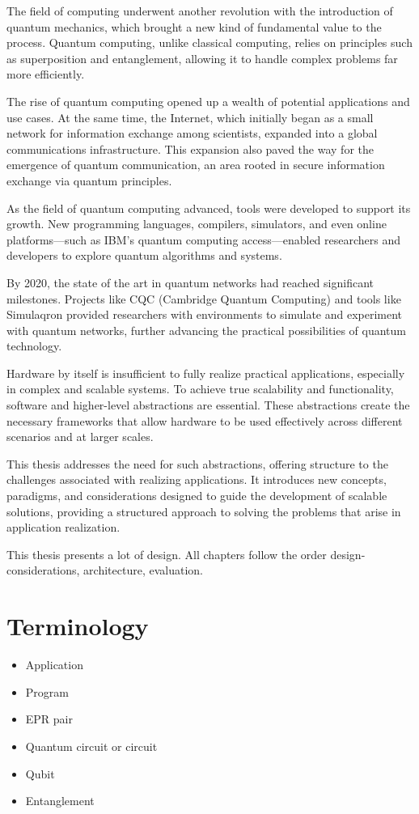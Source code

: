The field of computing underwent another revolution with the introduction of quantum mechanics, which brought a new kind of fundamental value to the process.
Quantum computing, unlike classical computing, relies on principles such as superposition and entanglement, allowing it to handle complex problems far more efficiently.

The rise of quantum computing opened up a wealth of potential applications and use cases.
At the same time, the Internet, which initially began as a small network for information exchange among scientists, expanded into a global communications infrastructure.
This expansion also paved the way for the emergence of quantum communication, an area rooted in secure information exchange via quantum principles.

As the field of quantum computing advanced, tools were developed to support its growth.
New programming languages, compilers, simulators, and even online platforms—such as IBM's quantum computing access—enabled researchers and developers to explore quantum algorithms and systems.

By 2020, the state of the art in quantum networks had reached significant milestones.
Projects like CQC (Cambridge Quantum Computing) and tools like Simulaqron provided researchers with environments to simulate and experiment with quantum networks, further advancing the practical possibilities of quantum technology.



Hardware by itself is insufficient to fully realize practical applications, especially in complex and scalable systems.
To achieve true scalability and functionality, software and higher-level abstractions are essential.
These abstractions create the necessary frameworks that allow hardware to be used effectively across different scenarios and at larger scales.

This thesis addresses the need for such abstractions, offering structure to the challenges associated with realizing applications.
It introduces new concepts, paradigms, and considerations designed to guide the development of scalable solutions, providing a structured approach to solving the problems that arise in application realization.



This thesis presents a lot of design.
All chapters follow the order design-considerations, architecture, evaluation.


\section{Terminology}
\begin{itemize}
  \item Application
  \item Program
  \item EPR pair
  \item Quantum circuit or circuit
  \item Qubit
  \item Entanglement
\end{itemize}




